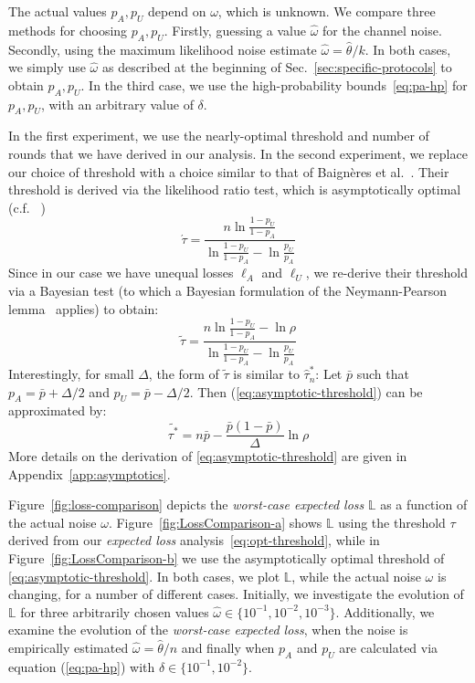 \documentclass[a4paper]{article}
\newcommand \thr {\tau}
\newcommand \hthr {\hat{\thr}_n^*}
\newcommand \noise {\omega}
\newcommand \worst {\mathbb{L}}
\newcommand \pa {p_A}
\newcommand \pu {p_U}
\theoremstyle{plain} \newtheorem{remark}{Remark}
\theoremstyle{plain} \newtheorem{definition}{Definition}
\theoremstyle{plain} \newtheorem{example}{Example}
\theoremstyle{plain} \newtheorem{assumption}{Assumption}
\theoremstyle{plain} \newtheorem{conjecture}{Conjecture}
\theoremstyle{plain} \newtheorem{theorem}{Theorem}
\theoremstyle{plain} \newtheorem{proposition}{Proposition}
\theoremstyle{plain} \newtheorem{lemma}{Lemma}
\theoremstyle{plain} \newtheorem{corollary}{Corollary}
\begin{document}
The actual values $\pa, \pu$ depend on $\noise$, which is unknown. We
compare three methods for choosing $\pa, \pu$. Firstly, guessing a
value $\hat{\noise}$ for the channel noise. Secondly, using the maximum
likelihood noise estimate $\hat{\noise} = \hat{\theta} / k$.  In both
cases, we simply use $\hat{\omega}$ as described at the beginning of
Sec.~\ref{sec:specific-protocols} to obtain $\pa, \pu$.  In the third
case, we use the high-probability bounds~\eqref{eq:pa-hp} for $\pa,
\pu$, with an arbitrary value of $\delta$.

In the first experiment, we use the nearly-optimal threshold and
number of rounds that we have derived in our analysis.  In the second
experiment, we replace our choice of threshold with a choice similar
to that of Baign\`{e}res et al.~\cite{ProvSec2010}. Their threshold is
derived via the likelihood ratio test, which is asymptotically optimal
(c.f. ~\cite{Degroot:OptimalStatisticalDecisions,Chernoff:SequentialDesignExperiments})
\begin{equation}
\acute{\tau}= \frac {n \ln \frac {1-\pu} {1-\pa}}  {
\ln \frac {1-\pu} {1-\pa} - {\ln{ \frac {\pu}{\pa}}}}
\end{equation}
Since in our case we have unequal losses $\ell_A$ and $\ell_U$, we
re-derive their threshold via a Bayesian test (to which a Bayesian
formulation of the Neymann-Pearson
lemma~\cite{Degroot:OptimalStatisticalDecisions} applies) to obtain:
\begin{equation}
\tilde{\tau}= \frac {n \ln \frac {1-\pu} {1-\pa} - \ln \rho}  {
\ln \frac {1-\pu} {1-\pa} - {\ln{ \frac {\pu}{\pa}}}}
\label{eq:asymptotic-threshold}
\end{equation}
Interestingly, for small $\Delta$, the form of $\tilde{\tau}$ is
similar to $\hthr$: Let $\bar{p}$ such that $\pa = \bar{p} + \Delta/2$
and $\pu = \bar{p} - \Delta/2$. Then (\ref{eq:asymptotic-threshold})
can be approximated by:
\begin{equation}
\tilde{\tau^*}=    n\bar{p} - \frac {  \bar{p}(1-\bar{p})   } {\Delta} \ln{\rho}
\end{equation}
More details on the derivation of \eqref{eq:asymptotic-threshold} are
given in Appendix~\ref{app:asymptotics}.

Figure~\ref{fig:loss-comparison} depicts the \textit{worst-case
  expected loss} $\worst$ as a function of the actual noise $\noise$.
Figure~\ref{fig:LossComparison-a} shows $\worst$ using the threshold
$\tau$ derived from our {\em expected loss}
analysis~\eqref{eq:opt-threshold}, while in
Figure~\ref{fig:LossComparison-b} we use the asymptotically optimal
threshold of \eqref{eq:asymptotic-threshold}. In both cases, we plot
$\worst$, while the actual noise $\noise$ is changing, for a number of
different cases. Initially, we investigate the evolution of $\worst$
for three arbitrarily chosen values $\hat{\noise} \in \{10^{-1},
10^{-2}, 10^{-3}\}$. Additionally, we examine the evolution of the
{\em worst-case expected loss}, when the noise is empirically
estimated $\hat{\noise} = \hat{\theta} / n$ and finally when $\pa$ and
$\pu$ are calculated via equation (\ref{eq:pa-hp}) with $\delta \in \{
10^{-1}, 10^{-2}\}$.
\end{document}
